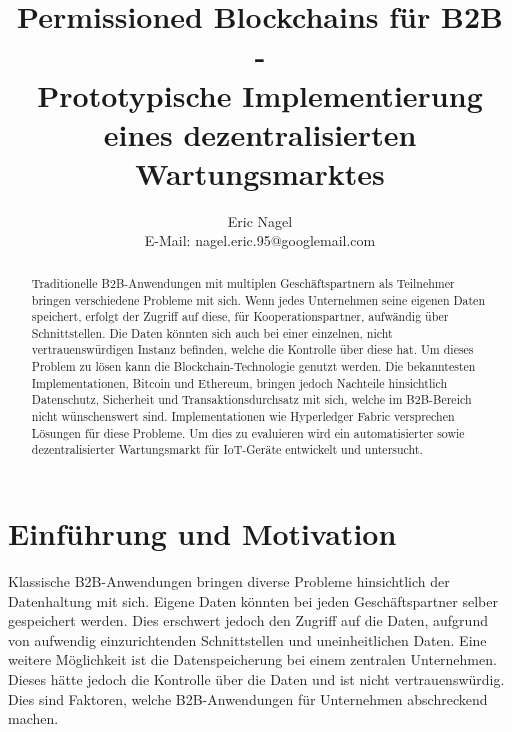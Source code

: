 \documentclass{llncs}
\begin{document}
\mainmatter

\title{Permissioned Blockchains für B2B -\\ Prototypische Implementierung eines dezentralisierten Wartungsmarktes}
\author{Eric Nagel \\ E-Mail: nagel.eric.95@googlemail.com}

\maketitle

\begin{abstract}
Traditionelle B2B-Anwendungen mit multiplen Geschäftspartnern als Teilnehmer bringen verschiedene Probleme mit sich. Wenn jedes Unternehmen seine eigenen Daten speichert, erfolgt der Zugriff auf diese, für Kooperationspartner, aufwändig über Schnittstellen. Die Daten könnten sich auch bei einer einzelnen, nicht vertrauenswürdigen Instanz befinden, welche die Kontrolle über diese hat. Um dieses Problem zu lösen kann die Blockchain-Technologie genutzt werden. Die bekanntesten Implementationen, Bitcoin und Ethereum, bringen jedoch Nachteile hinsichtlich Datenschutz, Sicherheit und Transaktionsdurchsatz mit sich, welche im B2B-Bereich nicht wünschenswert sind. Implementationen wie Hyperledger Fabric versprechen Lösungen für diese Probleme. Um dies zu evaluieren wird ein automatisierter sowie dezentralisierter Wartungsmarkt für IoT-Geräte entwickelt und untersucht.
\end{abstract}

\section{Einführung und Motivation}
Klassische B2B-Anwendungen bringen diverse Probleme hinsichtlich der Datenhaltung mit sich. Eigene Daten könnten bei jeden Geschäftspartner selber gespeichert werden. Dies erschwert jedoch den Zugriff auf die Daten, aufgrund von aufwendig einzurichtenden Schnittstellen und uneinheitlichen Daten. Eine weitere Möglichkeit ist die Datenspeicherung bei einem zentralen Unternehmen. Dieses hätte jedoch die Kontrolle über die Daten und ist nicht vertrauenswürdig. Dies sind Faktoren, welche B2B-Anwendungen für Unternehmen abschreckend machen.
\end{document}
